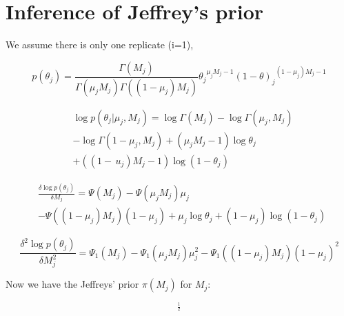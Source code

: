 \documentclass[11pt,reqno]{amsart}
\begin{document}
\section{Inference of Jeffrey's prior}\label{sec:appendix_Jeffreys}
We assume there is only one replicate (i=1),

\begin{equation}\label{eqn:Betapdf}
p\left({\theta }_{j} \right)= \frac{\Gamma \left({M}_{j} \right)}{\Gamma \left({\mu }_{j} {M}_{j}\right)\Gamma \left(( 1-{\mu }_{j}){M}_{j}\right)} {{\theta}_{j}}^{{\mu}_{j}{M}_{j}-1}{\left(1-\theta\right)_{j}}^{\left(1-{\mu}_{j}\right){M}_{j}-1}
\end{equation}

\begin{equation}\label{equ:JefferyInference1}
\begin{split}
&\log p\left(\theta_{j}|\mu_{j},M_{j}\right) =\log \Gamma \left(M_{j}\right)-\log \Gamma\left(\mu_{j},M_{j}\right)\\
&- \log \Gamma\left(1-\mu_{j},M_{j}\right) + (\mu_{j}M_{j}-1)\log\theta_{j}\\
& + ((1-\,u_{j})M_{j}-1)\log(1-\theta_{j})\
\end{split}
\end{equation}

\begin{equation}
\begin{split}
&\frac{\delta\log p(\theta_{j})}{\delta M_{j}} =\Psi(M_{j}) - \Psi(\mu_{j} M_{j})\mu_{j}\\
&- \Psi((1-\mu_{j})M_{j})(1-\mu_{j}) +\mu_{j}\log\theta_{j} + (1-\mu_{j})\log(1-\theta_{j})\
\end{split}
\end{equation}

\begin{equation}
\frac{\delta^{2}\log p(\theta_{j})}{\delta M_{j}^{2}}  = \Psi_{1}(M_{j}) - \Psi_{1}(\mu_{j} M_{j})\mu_{j}^{2} - \Psi_{1}((1-\mu_{j})M_{j})(1-\mu_{j})^{2}
\end{equation}

Now we have the Jeffreys' prior $\pi\left({M}_{j}\right)$ for $M_{j}$:

\begin{equation}
[-\left(\Psi_{1}(M_{j}) - \Psi_{1}(\mu_{j} M_{j})\mu_{j}^{2} - \Psi_{1}((1-\mu_{j})M_{j}){(1-\mu_{j})^{2}}\right)]^{\frac{1}{2}}
\end{equation}




\end{document}
